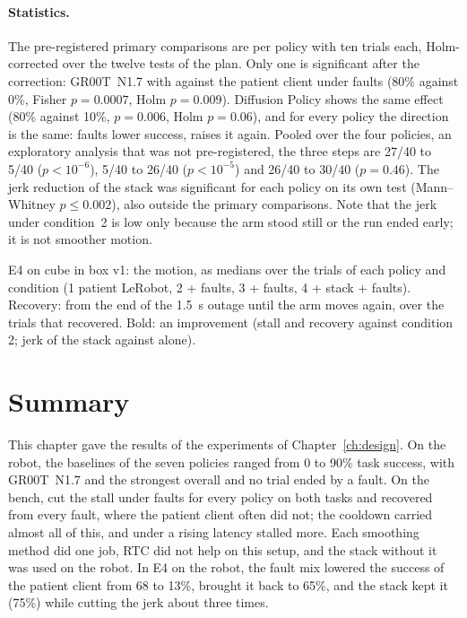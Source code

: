 \paragraph{Statistics.} The pre-registered primary comparisons are per policy with ten trials each, Holm-corrected over
the twelve tests of the plan. Only one is significant after the correction: GR00T~N1.7 with \drtc{} against the
patient client under faults (80\% against 0\%, Fisher $p=0.0007$, Holm $p=0.009$). Diffusion Policy shows the same
effect (80\% against 10\%, $p=0.006$, Holm $p=0.06$), and for every policy the direction is the same: faults lower
success, \drtc{} raises it again. Pooled over the four policies, an exploratory analysis that was not pre-registered,
the three steps are 27/40 to 5/40 ($p<10^{-6}$), 5/40 to 26/40 ($p<10^{-5}$) and 26/40 to 30/40 ($p=0.46$). The jerk
reduction of the stack was significant for each policy on its own test (Mann--Whitney $p\le0.002$), also outside the
primary comparisons. Note that the jerk under condition~2 is low only because the arm stood still or the run ended
early; it is not smoother motion.

\begin{table}[htbp]
  \centering
  \small
  \begin{adjustbox}{max width=\textwidth}
  \end{adjustbox}
  \caption{E4 on cube in box v1: the motion, as medians over the trials of each policy and condition (1 patient
           LeRobot, 2 + faults, 3 \drtc{} + faults, 4 \drtc{} + stack + faults). Recovery: from the end of the 1.5~s
           outage until the arm moves again, over the trials that recovered. Bold: an improvement (stall and recovery against
           condition 2; jerk of the stack against \drtc{} alone).}\label{tab:e4motion}
\end{table}


\section{Summary}
This chapter gave the results of the experiments of Chapter~\ref{ch:design}. On the robot, the baselines of the seven
policies ranged from 0 to 90\% task success, with GR00T~N1.7 and \smolvla{} the strongest overall and no trial ended by
a fault. On the bench, \drtc{} cut the stall under faults for every policy on both tasks and recovered from every
fault, where the patient client often did not; the cooldown carried almost all of this, and under a rising latency
\drtc{} stalled more. Each smoothing method did one job, RTC did not help on this setup, and the stack without it was
used on the robot. In E4 on the robot, the fault mix lowered the success of the patient client from 68 to 13\%, \drtc{}
brought it back to 65\%, and the stack kept it (75\%) while cutting the jerk about three times.
